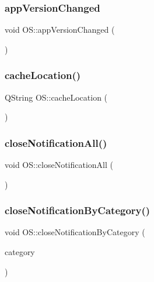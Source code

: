 \mbox{\label{classOS_a39f7a3688e008fde1008e6b7e5b5ebcb}} 
\subsubsection{\texorpdfstring{app\+Version\+Changed}{appVersionChanged}}
{\footnotesize\ttfamily void O\+S\+::app\+Version\+Changed (\begin{DoxyParamCaption}{ }\end{DoxyParamCaption})\hspace{0.3cm}{\ttfamily [signal]}}

\mbox{\label{classOS_a44dcb6a2ee199b111d98eb1e364bfef7}} 
\subsubsection{\texorpdfstring{cache\+Location()}{cacheLocation()}}
{\footnotesize\ttfamily Q\+String O\+S\+::cache\+Location (\begin{DoxyParamCaption}{ }\end{DoxyParamCaption})}

\mbox{\label{classOS_a16c6da56d519e2c2bccbdeaf5c4ff29b}} 
\subsubsection{\texorpdfstring{close\+Notification\+All()}{closeNotificationAll()}}
{\footnotesize\ttfamily void O\+S\+::close\+Notification\+All (\begin{DoxyParamCaption}{ }\end{DoxyParamCaption})}

\mbox{\label{classOS_a8ab936784f48408f14ad73f10ae5afb8}} 
\subsubsection{\texorpdfstring{close\+Notification\+By\+Category()}{closeNotificationByCategory()}}
{\footnotesize\ttfamily void O\+S\+::close\+Notification\+By\+Category (\begin{DoxyParamCaption}\item[{Q\+String}]{category }\end{DoxyParamCaption})}

